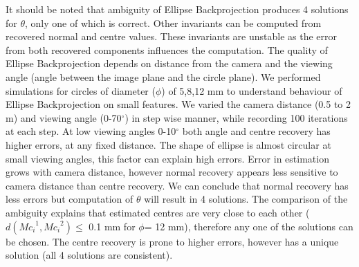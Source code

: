 \documentclass{bmvc2k}
\begin{document}
It should be noted that ambiguity of Ellipse Backprojection produces 4 solutions for $\theta$, only one of which is correct. 
Other invariants can be computed from recovered normal and centre values. These invariants are unstable \cite{forsyth_91} as the error from both recovered components influences the computation.
The quality of Ellipse Backprojection depends on distance from the camera and the viewing angle (angle between the image plane and the circle plane)\cite{werghi_pose_1996}. 
We performed simulations for circles of diameter ($\phi$) of 5,8,12 mm to understand behaviour of Ellipse Backprojection on small features. We varied the camera distance (0.5 to 2 m) and viewing angle (0-70$^\circ$) in step wise manner, while recording 100 iterations at each step.
At low viewing angles 0-10$^\circ$ both angle and centre recovery has higher errors, at any fixed distance. 
The shape of ellipse is almost circular at small viewing angles, this factor can explain high errors. 
Error in estimation grows with camera distance, however normal recovery appears less sensitive to camera distance than centre recovery. We can conclude that normal recovery has less errors but computation of $\theta$ will result in 4 solutions. The comparison of the ambiguity explains that estimated centres are very close to each other ($ d({Mc_i}^1,{Mc_i}^2) \leq$ 0.1 mm for $\phi$= 12 mm), therefore any one of the solutions can be chosen. The centre recovery is prone to higher errors, however has a unique solution (all 4 solutions are consistent).
\end{document}
